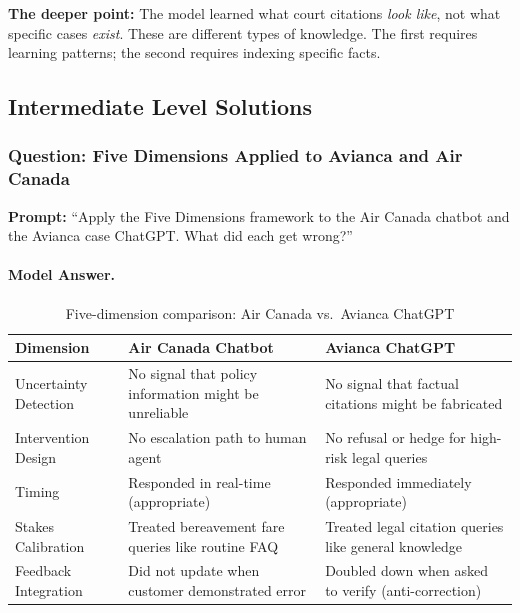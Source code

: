 \textbf{The deeper point:} The model learned what court citations \emph{look like}, not what specific cases \emph{exist}. These are different types of knowledge. The first requires learning patterns; the second requires indexing specific facts.

\subsection{Intermediate Level Solutions}

\subsubsection{Question: Five Dimensions Applied to Avianca and Air Canada}

\textbf{Prompt:} ``Apply the Five Dimensions framework to the Air Canada chatbot and the Avianca case ChatGPT. What did each get wrong?''

\paragraph{Model Answer.}

\begin{table}[htbp]
\caption{Five-dimension comparison: Air Canada vs.\ Avianca ChatGPT}
\label{tab:ch10-five-dim}
\centering
\begin{tabular}{@{}p{3cm}p{5cm}p{4.5cm}@{}}
\toprule
\textbf{Dimension} & \textbf{Air Canada Chatbot} & \textbf{Avianca ChatGPT} \\
\midrule
Uncertainty Detection & No signal that policy information might be unreliable & No signal that factual citations might be fabricated \\
Intervention Design & No escalation path to human agent & No refusal or hedge for high-risk legal queries \\
Timing & Responded in real-time (appropriate) & Responded immediately (appropriate) \\
Stakes Calibration & Treated bereavement fare queries like routine FAQ & Treated legal citation queries like general knowledge \\
Feedback Integration & Did not update when customer demonstrated error & Doubled down when asked to verify (anti-correction) \\
\bottomrule
\end{tabular}
\end{table}

